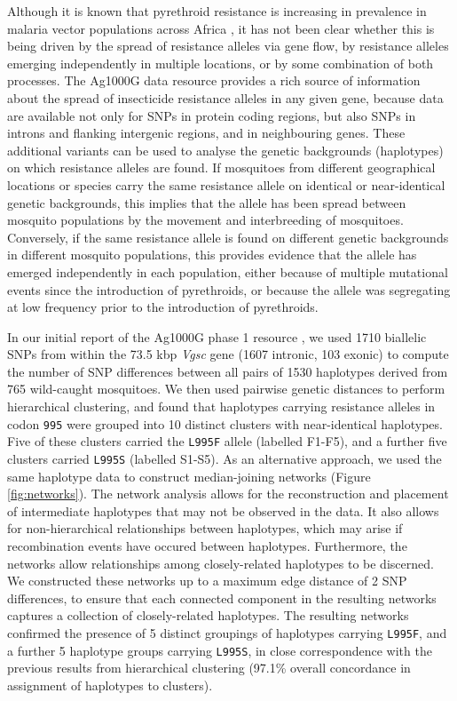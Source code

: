 \documentclass[a4paper,11pt,abstracton,hidelinks]{scrartcl}
\begin{document}
%
Although it is known that pyrethroid resistance is increasing in prevalence in malaria vector populations across Africa \cite{Ranson2016}, it has not been clear whether this is being driven by the spread of resistance alleles via gene flow, by resistance alleles emerging independently in multiple locations, or by some combination of both processes.
%
The Ag1000G data resource provides a rich source of information about the spread of insecticide resistance alleles in any given gene, because data are available not only for SNPs in protein coding regions, but also SNPs in introns and flanking intergenic regions, and in neighbouring genes.
%
These additional variants can be used to analyse the genetic backgrounds (haplotypes) on which resistance alleles are found.
%
If mosquitoes from different geographical locations or species carry the same resistance allele on identical or near-identical genetic backgrounds, this implies that the allele has been spread between mosquito populations by the movement and interbreeding of mosquitoes.
%
Conversely, if the same resistance allele is found on different genetic backgrounds in different mosquito populations, this provides evidence that the allele has emerged independently in each population, either because of multiple mutational events since the introduction of pyrethroids, or because the allele was segregating at low frequency prior to the introduction of pyrethroids.

%
In our initial report of the Ag1000G phase 1 resource \cite{Ag1000gConsortium2017}, we used 1710 biallelic SNPs from within the 73.5 kbp \textit{Vgsc} gene (1607 intronic, 103 exonic) to compute the number of SNP differences between all pairs of 1530 haplotypes derived from 765 wild-caught mosquitoes.
%
We then used pairwise genetic distances to perform hierarchical clustering, and found that haplotypes carrying resistance alleles in codon \texttt{995} were grouped into 10 distinct clusters with near-identical haplotypes.
%
Five of these clusters carried the \texttt{L995F} allele (labelled F1-F5), and a further five clusters carried \texttt{L995S} (labelled S1-S5).
%
As an alternative approach, we used the same haplotype data to construct median-joining networks (Figure \ref{fig:networks}).
%
The network analysis allows for the reconstruction and placement of intermediate haplotypes that may not be observed in the data.
%
It also allows for non-hierarchical relationships between haplotypes, which may arise if recombination events have occured between haplotypes.
%
Furthermore, the networks allow relationships among closely-related haplotypes to be discerned.
%
We constructed these networks up to a maximum edge distance of 2 SNP differences, to ensure that each connected component in the resulting networks captures a collection of closely-related haplotypes.
%
The resulting networks confirmed the presence of 5 distinct groupings of haplotypes carrying \texttt{L995F}, and a further 5 haplotype groups carrying \texttt{L995S}, in close correspondence with the previous results from hierarchical clustering (97.1\% overall concordance in assignment of haplotypes to clusters).
%
\end{document}
